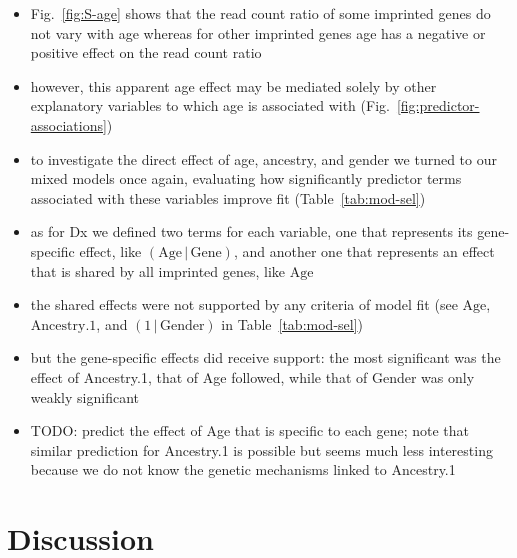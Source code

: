 \documentclass[letterpaper]{article}
\begin{document}
\begin{itemize}
\item Fig.~\ref{fig:S-age} shows that the read count ratio of some imprinted
genes do not vary with age whereas for other imprinted genes age has a
negative or positive effect on the read count ratio
\item however, this apparent age effect may be mediated solely by other explanatory variables
to which age is associated with (Fig.~\ref{fig:predictor-associations})
\item to investigate the direct effect of age, ancestry, and gender we turned
to our mixed models once again, evaluating how significantly predictor terms associated
with these variables improve fit (Table~\ref{tab:mod-sel})
\item as for Dx we defined two terms for each variable, one that
represents its gene-specific effect, like \((\mathrm{Age}\,|\,\mathrm{Gene})\), and another one that represents an
effect that is shared by all imprinted genes, like \(\mathrm{Age}\)
\item the shared effects were not supported by any criteria of model fit (see
\(\mathrm{Age}\), \(\mathrm{Ancestry.1}\), and \((1\,|\,\mathrm{Gender})\) in Table~\ref{tab:mod-sel})
\item but the gene-specific effects did receive support: the most significant
was the effect of Ancestry.1, that of Age
followed, while that of Gender was only weakly
significant 
\item TODO: predict the effect of Age that is specific to each gene;
note that similar prediction for Ancestry.1 is possible but seems much less
interesting because we do not know the genetic mechanisms linked to
Ancestry.1
\end{itemize}

\section{Discussion}
\end{document}
